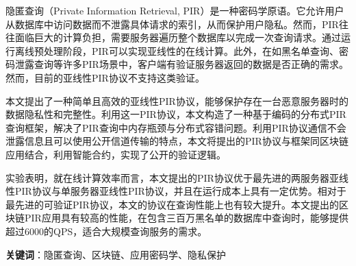 \cleardoublepage
{}

隐匿查询（Private Information Retrieval, PIR）是一种密码学原语。它允许用户从数据库中访问数据而不泄露具体请求的索引，从而保护用户隐私。然而，PIR往往面临巨大的计算负担，需要服务器遍历整个数据库以完成一次查询请求。通过运行离线预处理阶段，PIR可以实现亚线性的在线计算。此外，在如黑名单查询、密码泄露查询等许多PIR场景中，客户端有验证服务器返回的数据是否正确的需求。然而，目前的亚线性PIR协议不支持这类验证。

本文提出了一种简单且高效的亚线性PIR协议，能够保护存在一台恶意服务器时的数据隐私性和完整性。利用这一PIR协议，本文构造了一种基于编码的分布式PIR查询框架，解决了PIR查询中内存瓶颈与分布式容错问题。利用PIR协议通信不会泄露信息且可以使用公开信道传输的特点，本文将提出的PIR协议与框架同区块链应用结合，利用智能合约，实现了公开的验证逻辑。

实验表明，就在线计算效率而言，本文提出的PIR协议优于最先进的两服务器亚线性PIR协议与单服务器亚线性PIR协议，并且在运行成本上具有一定优势。相对于最先进的可验证PIR协议，本文的协议在查询性能上也有较大提升。本文提出的区块链PIR应用具有较高的性能，在包含三百万黑名单的数据库中查询时，能够提供超过6000的QPS，适合大规模查询服务的需求。

\bigskip
\noindent \textbf{关键词}：隐匿查询、区块链、应用密码学、隐私保护
\cleardoublepage
{}